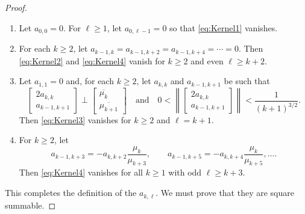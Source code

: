 \documentclass[10pt,reqno]{amsart}
\newcommand{\0}{{\color{lightgray}0}}
\renewcommand{\geq}{\geqslant}
\theoremstyle{definition}
\numberwithin{equation}{section}
\begin{document}
\begin{proof}
\begin{enumerate}
\item[(1)] Let $a_{0,0} = 0$.  For $\ell \geq 1$, let $a_{0,\ell-1} = 0$ so that \eqref{eq:Kernel1} vanishes.

\item[(2)] For each $k \geq 2$, let 
$a_{k-1,k} = a_{k-1,k+2} = a_{k-1,k+4} = \cdots = 0$.
Then \eqref{eq:Kernel2} and \eqref{eq:Kernel4} vanish for $k \geq 2$ and even $\ell \geq k+2$.

\item[(3)] Let $a_{1,1}=0$ and, for each $k \geq 2$, let $a_{k,k}$ and $a_{k-1,k+1}$ be such that
\begin{equation}\label{eq:PairOrthog}
\begin{bmatrix}
2a_{k,k} \\
a_{k-1,k+1}
\end{bmatrix} 
\perp
\begin{bmatrix}
\overline{\mu_k} \\
\overline{\mu_{k+1}}
\end{bmatrix}
\quad \text{and} \quad 
0<
\left\| 
\begin{bmatrix}
2a_{k,k} \\
a_{k-1,k+1}
\end{bmatrix} \right \| < \frac{1}{(k+1)^{3/2}}.
\end{equation}
Then \eqref{eq:Kernel3} vanishes for $k \geq 2$ and $\ell = k+1$.

\item[(4)] For $k \geq 2$, let
\begin{equation}\label{eq:Recur}
    a_{k-1, k+3} = - a_{k, k+2} \frac{\mu_k}{\mu_{k+3}}, \qquad
    a_{k-1, k+5}= - a_{k, k+4} \frac{\mu_k}{\mu_{k+5}},\ldots.  
\end{equation}
Then \eqref{eq:Kernel4} vanishes for all $k \geq 1$ with odd $\ell \geq k+3$.
\end{enumerate}
This completes the definition of the $a_{k,\ell}$.  We must prove that they are square summable.


\end{proof}
\end{document}
